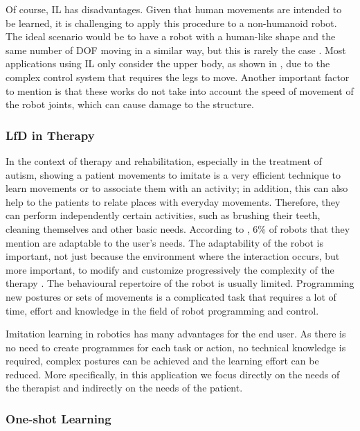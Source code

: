 \documentclass[thesis]{mas_proposal}
\begin{document}
		Of course, IL has disadvantages. Given that human movements are intended to be learned, it is challenging to apply this procedure to a non-humanoid robot. The ideal scenario would be to have a robot with a human-like shape and the same number of DOF moving in a similar way, but this is rarely the case \cite{Ravichandar2020}. Most applications using IL only consider the upper body, as shown in \cite{VanPerre2015}, due to the complex control system that requires the legs to move. Another important factor to mention is that these works do not take into account the speed of movement of the robot joints, which can cause damage to the structure. 
		
	\subsubsection{LfD in Therapy}
		In the context of therapy and rehabilitation, especially in the treatment of autism, showing a patient movements to imitate is a very efficient technique to learn movements or to associate them with an activity; in addition, this can also help to the patients to relate places with everyday movements. Therefore, they can perform independently certain activities, such as brushing their teeth, cleaning themselves and other basic needs. According to \cite{Cabibihan2013}, 6\% of robots that they mention are adaptable to the user's needs. The adaptability of the robot is important, not just because the environment where the interaction occurs, but more important, to modify and customize progressively the complexity of the therapy \cite{Dickstein2018}. The behavioural repertoire of the robot is usually limited. Programming new postures or sets of movements is a complicated task that requires a lot of time, effort and knowledge in the field of robot programming and control.
		
		Imitation learning in robotics has many advantages for the end user. As there is no need to create programmes for each task or action, no technical knowledge is required, complex postures can be achieved and the learning effort can be reduced. More specifically, in this application we focus directly on the needs of the therapist \cite{Ravichandar2020, Kulikovskiy2021} and indirectly on the needs of the patient. 	

	\subsubsection{One-shot Learning}
\end{document}
